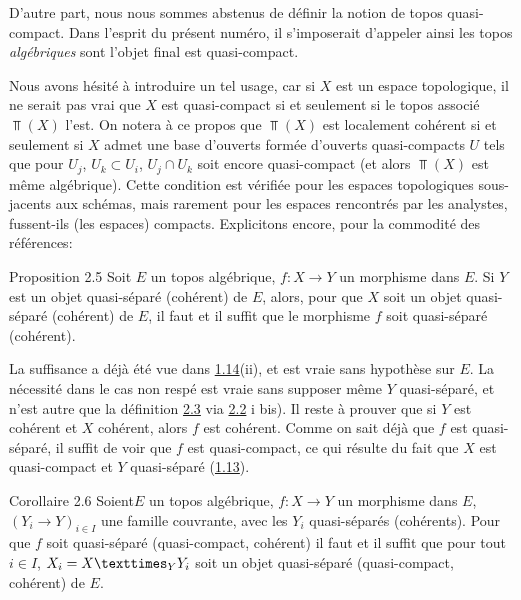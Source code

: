 \documentclass[10pt]{../fichiers-configuration-latex/smfart}
\begin{document}
D'autre part, nous nous sommes abstenus de définir la notion de topos
quasi-compact. Dans l'esprit du présent numéro, il s'imposerait
d'appeler ainsi les topos \emph{algébriques} sont l'objet final est
quasi-compact.

Nous \pageoriginale avons hésité à introduire un tel usage, car si
$X$ est un espace topologique, il ne serait pas vrai que $X$ est
quasi-compact si et seulement si le topos associé $\Top(X)$ l'est.
On notera à ce propos que $\Top(X)$ est localement cohérent si et
seulement si $X$ admet une base d'ouverts formée d'ouverts
quasi-compacts $U$ tels que pour $U_j$, $U_k \subset U_i$, $U_j \cap
U_k$ soit encore quasi-compact (et alors $\Top(X)$ est même
algébrique). Cette condition est vérifiée pour les espaces
topologiques sous-jacents aux schémas, mais rarement pour les
espaces rencontrés par les analystes, fussent-ils (les espaces)
compacts. Explicitons encore, pour la commodité des références:

\begin{enonce*}{Proposition 2.5}
Soit $E$ un topos algébrique, $f : X \to Y$ un morphisme dans $E$. Si
$Y$ est un objet quasi-séparé (\resp cohérent) de $E$, alors, pour que
$X$ soit un objet quasi-séparé (\resp cohérent) de $E$, il faut et il
suffit que le morphisme $f$ soit quasi-séparé (\resp cohérent).
\end{enonce*}

La suffisance a déjà été vue dans \hyperref[VI.prop1.14]{1.14}(ii), et est vraie sans
hypothèse sur $E$. La nécessité dans le cas non respé est vraie sans
supposer même $Y$ quasi-séparé, et n'est  autre que la définition \hyperref[VI.def2.3]{2.3}
via \hyperref[VI.prop2.2]{2.2} i bis). Il reste à prouver que si $Y$ est cohérent et $X$
cohérent, alors $f$ est cohérent. Comme on sait déjà que $f$ est
quasi-séparé, il suffit de voir que $f$ est quasi-compact, ce qui
résulte du fait que $X$ est quasi-compact et $Y$ quasi-séparé (\hyperref[VI.def1.13]{1.13}).

\begin{enonce*}{Corollaire 2.6}
Soient\pageoriginale $E$ un topos algébrique, $f: X \to Y$ un
morphisme dans $E$, $(Y_i \to Y)_{i \in I}$ une famille couvrante, avec les $Y_i$
quasi-séparés (\resp  cohérents). Pour que $f$ soit quasi-séparé
(\resp quasi-compact, \resp cohérent) il faut et il suffit que pour
tout $i \in I$, $X_i = \fprod{X}{Y_i}{Y}$ soit un objet quasi-séparé
(\resp quasi-compact, \resp cohérent) de $E$.
\end{enonce*}
\end{document}
